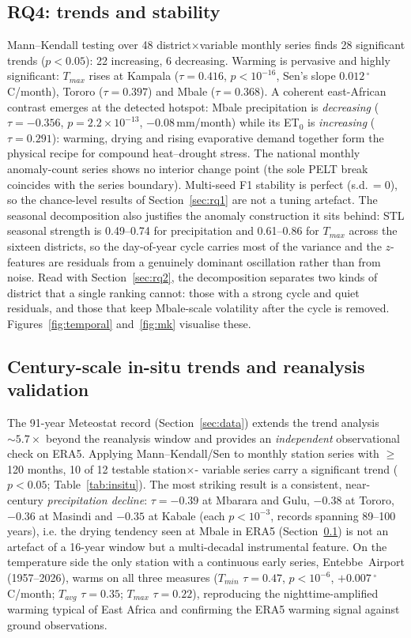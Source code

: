 \documentclass[preprint,12pt]{elsarticle}
\begin{document}
\subsection{RQ4: trends and stability}
\label{sec:rq4}
Mann--Kendall testing over 48 district$\times$variable monthly series finds 28
significant trends ($p<0.05$): 22 increasing, 6 decreasing. Warming is pervasive
and highly significant: $T_{max}$ rises at Kampala ($\tau=0.416$,
$p<10^{-16}$, Sen's slope $0.012\,^\circ$C/month), Tororo ($\tau=0.397$) and
Mbale ($\tau=0.368$). A coherent east-African contrast emerges at the detected
hotspot: Mbale precipitation is \emph{decreasing} ($\tau=-0.356$,
$p=2.2\times10^{-13}$, $-0.08$\,mm/month) while its ET$_0$ is
\emph{increasing} ($\tau=0.291$): warming, drying and rising
evaporative demand together form the physical recipe for compound heat--drought
stress. The
national monthly anomaly-count series shows no interior change point
(the sole PELT break coincides with the series boundary). Multi-seed F1
stability is perfect (s.d.\,$=0$), so the chance-level results of
Section~\ref{sec:rq1} are not a tuning artefact. The seasonal decomposition also
justifies the anomaly construction it sits behind: STL seasonal strength is
0.49--0.74 for precipitation and 0.61--0.86 for $T_{max}$ across the sixteen
districts, so the day-of-year cycle carries most of the variance and the
$z$-features are residuals from a genuinely dominant oscillation rather than from
noise. Read with Section~\ref{sec:rq2}, the decomposition separates two kinds of
district that a single ranking cannot: those with a strong cycle and quiet
residuals, and those that keep Mbale-scale volatility after the cycle is removed.
Figures~\ref{fig:temporal} and~\ref{fig:mk} visualise these.

\subsection{Century-scale in-situ trends and reanalysis validation}
\label{sec:insitu}
The 91-year Meteostat record (Section~\ref{sec:data}) extends the trend
analysis $\sim5.7\times$ beyond the reanalysis window and provides an
\emph{independent} observational check on ERA5. Applying Mann--Kendall/Sen to
monthly station series with $\geq$120 months, 10 of 12 testable station$\times$-
variable series carry a significant trend ($p<0.05$; Table~\ref{tab:insitu}). The
most striking result is a consistent, near-century \emph{precipitation decline}:
$\tau=-0.39$ at Mbarara and
Gulu, $-0.38$ at Tororo, $-0.36$ at Masindi and $-0.35$ at Kabale (each
$p<10^{-3}$, records spanning 89--100 years), i.e. the drying tendency seen at
Mbale in ERA5 (Section~\ref{sec:rq4}) is not an artefact of a 16-year window but
a multi-decadal instrumental feature. On the temperature side the only station
with a continuous early series, Entebbe~Airport (1957--2026), warms on all three
measures ($T_{min}$ $\tau=0.47$, $p<10^{-6}$, $+0.007\,^\circ$C/month;
$T_{avg}$ $\tau=0.35$; $T_{max}$ $\tau=0.22$), reproducing the
nighttime-amplified warming typical of East Africa and confirming the ERA5
warming signal against ground observations.
\end{document}
